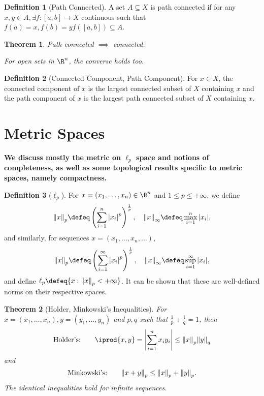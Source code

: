 \documentclass[12pt, oneside]{article}
\theoremstyle{definition}
\newtheorem{defn}{Definition}
\theoremstyle{plain}
\newtheorem{thm}{Theorem}
\theoremstyle{remark}
\let\origsection=\section
\renewcommand\section[1]{\origsection{#1}\label{sec:\thesection}}
\begin{document}
\begin{defn}[Path Connected]
  A set $A \subseteq X$ is path connected if for any $x, y \in A, \exists f : [a, b] \to X$ continuous such that $f(a) = x, f(b) = y f([a, b]) \subseteq A$.
\end{defn}

\begin{thm}
  Path connected $\implies$ connected.

  For open sets in $\R^n$, the converse holds too.
\end{thm}

\begin{defn}[Connected Component, Path Component]
  For $x \in X$, the connected component of $x$ is the largest connected subset of $X$ containing $x$ and the path component of $x$ is the largest path connected subset of $X$ containing $x$.
\end{defn}

\section{Metric Spaces}

\textbf{We discuss mostly the metric on $\ell_p$ space and notions of completeness, as well as some topological results specific to metric spaces, namely compactness.}

\begin{defn}[$\ell_p$]
  For $x = (x_1, \dots, x_n) \in \R^n$ and $1 \leq p \leq + \infty$, we define \[
  \norm{x}_p \defeq \left(\sum_{i=1}^n \abs{x_i}^p\right)^{\frac{1}{p}}, \quad \norm{x}_\infty \defeq \max_{i=1}^n \abs{x_i},
  \]
  and similarly, for sequences $x = (x_1, \dots, x_n, \dots)$, \[
  \norm{x}_p \defeq   \left(\sum_{i=1}^\infty \abs{x_i}^p\right)^{\frac{1}{p}}, \quad \norm{x}_\infty \defeq \sup_{i=1}^\infty \abs{x_i},
  \]
  and define $\ell_p \defeq \{x : \norm{x}_p < +\infty\}$. It can be shown that these are well-defined norms on their respective spaces.
\end{defn}

\begin{thm}[Holder, Minkowski's Inequalities]
  For $x = (x_1, \dots, x_n), y = (y_1, \dots, y_n)$ and $p, q$ such that $\frac{1}{p} + \frac{1}{q} = 1$, then \[
  \text{Holder's:} \qquad \iprod{x, y} = \abs{\sum_{i=1}^n x_i y_i} \leq \norm{x}_p \norm{y}_q  
  \]
  and \[
  \text{Minkowski's:} \qquad \norm{x + y}_p \leq \norm{x}_p + \norm{y}_p .
  \]
  The identical inequalities hold for infinite sequences.
\end{thm}
\end{document}
